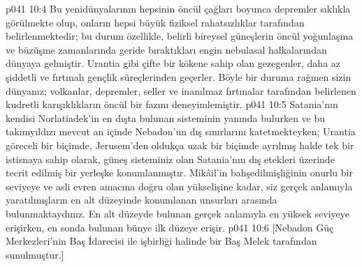 \vs p041 10:4 Bu yenidünyalarının hepsinin öncül çağları boyunca depremler sıklıkla görülmekte olup, onların hepsi büyük fiziksel rahatsızlıklar tarafından belirlenmektedir; bu durum özellikle, belirli bireysel güneşlerin öncül yoğunlaşma ve büzüşme zamanlarında geride bıraktıkları engin nebulasal halkalarından dünyaya gelmiştir. Urantia gibi çifte bir kökene sahip olan gezegenler, daha az şiddetli ve fırtınalı gençlik süreçlerinden geçerler. Böyle bir duruma rağmen sizin dünyanız; volkanlar, depremler, seller ve inanılmaz fırtınalar tarafından belirlenen kudretli karışıklıkların öncül bir fazını deneyimlemiştir.
\vs p041 10:5 Satania’nın kendisi Norlatiadek’in en dışta bulunan sisteminin yanında bulurken ve bu takımyıldızı mevcut an içinde Nebadon’un dış sınırlarını katetmekteyken; Urantia göreceli bir biçimde, Jerusem’den oldukça uzak bir biçimde ayrılmış halde tek bir istisnaya sahip olarak, güneş sisteminiz olan Satania’nın dış etekleri üzerinde tecrit edilmiş bir yerleşke konumlanmıştır. Mikâil’in bahşedilmişliğinin onurlu bir seviyeye ve asli evren amacına doğru olan yükselişine kadar, siz gerçek anlamıyla yaratılmışların en alt düzeyinde konumlanan unsurları arasında bulunmaktaydınız. En alt düzeyde bulunan gerçek anlamıyla en yüksek seviyeye erişirken, en sonda bulunan bünye ilk düzeye erişir.
\vs p041 10:6 [Nebadon Güç Merkezleri’nin Baş İdarecisi ile işbirliği halinde bir Baş Melek tarafından sunulmuştur.]
